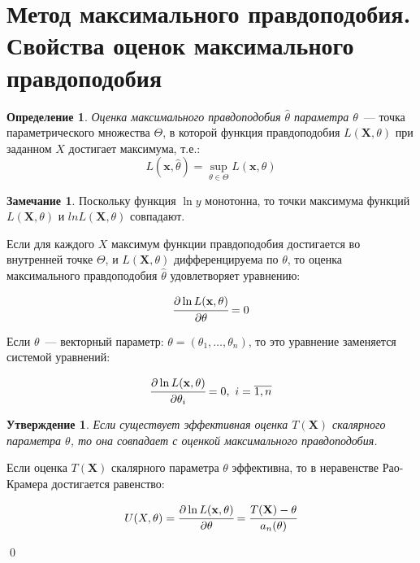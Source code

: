 \documentclass[oneside,final,14pt]{extreport}
\renewenvironment{proof}{{\bfseries Доказательство.}}{\qed}
\theoremstyle{plain}
\newtheorem*{thm*}{Утверждение}
\theoremstyle{definition}
\newtheorem*{defn}{Определение}
\newtheorem*{rmrk}{Замечание}
\theoremstyle{named}
\begin{document}
\section{Метод максимального правдоподобия. Свойства оценок максимального правдоподобия}

\begin{defn}
{\it Оценка максимального правдоподобия $\hat{\theta}$ параметра $\theta$}~--- точка параметрического множества $\Theta$, в которой функция правдоподобия $L(\mathbf{X},\theta)$ при заданном $X$ достигает максимума, т.е.:
\begin{equation*}
    L(\boldsymbol{x}, \hat{\theta})=\sup _{\theta \in \Theta} L(\boldsymbol{x}, \theta)
\end{equation*}
\end{defn}

\begin{rmrk}
Поскольку функция $\operatorname{ln}y$ монотонна, то точки максимума функций $L(\mathbf{X},\theta)$ и $ln L(\mathbf{X},\theta)$ совпадают.
\end{rmrk}

Если для каждого $X$ максимум функции правдоподобия достигается во внутренней точке $\Theta$, и $L(\mathbf{X},\theta)$ дифференцируема по $\theta$, то оценка максимального правдоподобия $\hat{\theta}$ удовлетворяет уравнению:

\begin{equation*}
    \cfrac{\partial \ln L(\mathbf{x}, \theta)}{\partial \theta}=0
\end{equation*}

Если $\theta$~--- векторный параметр: $\theta=\left(\theta_{1}, \ldots, \theta_{n}\right)$, то это уравнение заменяется системой уравнений:

\begin{equation*}
    \cfrac{\partial \ln L(\mathbf{x}, \theta)}{\partial \theta_{i}}=0,~ i=\overline{1, n} 
\end{equation*}


\begin{thm*}
Если существует эффективная оценка $T(\mathbf{X})$ скалярного параметра $\theta$, то она совпадает с оценкой максимального правдоподобия.
\end{thm*}

\begin{proof}
Если оценка $T(\mathbf{X})$ скалярного параметра $\theta$ эффективна, то в неравенстве Рао-Крамера достигается равенство:

\begin{equation*}
    U(X,\theta) = \cfrac{\partial \ln L(\mathbf{x}, \theta)}{\partial \theta}=\cfrac{T(\mathbf{X})-\theta}{a_n(\theta)}
\end{equation*}

\end{proof}
\end{document}
